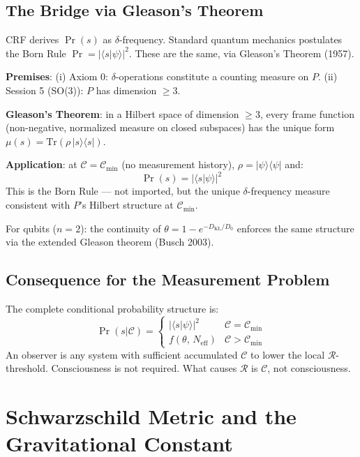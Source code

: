 \documentclass[12pt]{article}
\begin{document}
\subsection{The Bridge via Gleason's Theorem}

CRF derives $\Pr(s)$ as $\delta$-frequency. Standard quantum
mechanics postulates the Born Rule $\Pr = |\langle s|\psi\rangle|^2$.
These are the same, via Gleason's Theorem (1957).

\begin{derivedbox}
\textbf{Premises}: (i) Axiom 0: $\delta$-operations constitute a
counting measure on $P$. (ii) Session 5 (SO(3)): $P$ has
dimension $\geq 3$.

\textbf{Gleason's Theorem}: in a Hilbert space of dimension
$\geq 3$, every frame function (non-negative, normalized measure
on closed subspaces) has the unique form
$\mu(s) = \mathrm{Tr}(\rho\,|s\rangle\langle s|)$.

\textbf{Application}: at $\mathcal{C} = \mathcal{C}_{\min}$
(no measurement history), $\rho = |\psi\rangle\langle\psi|$ and:
\[
  \Pr(s) = |\langle s|\psi\rangle|^2
\]
This is the Born Rule --- not imported, but the unique
$\delta$-frequency measure consistent with $P$'s Hilbert
structure at $\mathcal{C}_{\min}$.

For qubits ($n=2$): the continuity of
$\theta = 1 - e^{-D_{\mathrm{KL}}/D_0}$ enforces the same
structure via the extended Gleason theorem (Busch 2003).
\end{derivedbox}

\subsection{Consequence for the Measurement Problem}

The complete conditional probability structure is:
\[
  \Pr(s|\mathcal{C}) =
  \begin{cases}
    |\langle s|\psi\rangle|^2 & \mathcal{C} = \mathcal{C}_{\min} \\
    f(\theta,\, N_{\mathrm{eff}}) & \mathcal{C} > \mathcal{C}_{\min}
  \end{cases}
\]
An observer is any system with sufficient accumulated $\mathcal{C}$
to lower the local $\mathcal{R}$-threshold. Consciousness is not
required. What causes $\mathcal{R}$ is $\mathcal{C}$, not
consciousness.

\section{Schwarzschild Metric and the Gravitational Constant}
\end{document}
